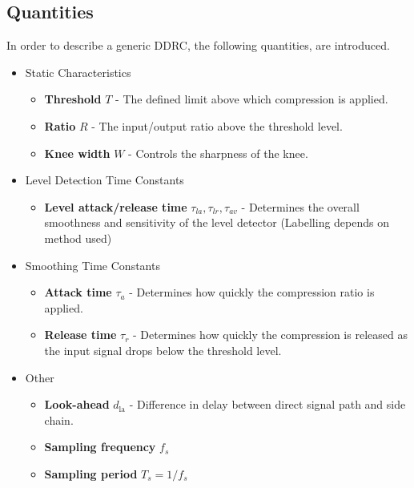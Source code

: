 \documentclass[../main2.tex]{subfiles}
\begin{document}
\subsection{Quantities}\label{theory_definitions}
In order to describe a generic DDRC, the following quantities, are introduced.
\begin{itemize}
\item{Static Characteristics}
	\begin{itemize}
	\item \textbf{Threshold} $T$ - The defined limit above which compression is applied.
	\item \textbf{Ratio} $R$ - The input/output ratio above the threshold level.
	\item \textbf{Knee width}  $W$ - Controls the sharpness of the knee.
\end{itemize}
\item{Level Detection Time Constants}
	\begin{itemize}
	\item \textbf{Level attack/release time} $\tau_{la}, \tau_{lr}, \tau_{av}$ - Determines the overall smoothness and sensitivity of the level detector (Labelling depends on method used)
	\end{itemize}
\item{Smoothing Time Constants}
	\begin{itemize}
	\item \textbf{Attack time} $\tau_{a}$ - Determines how quickly the compression ratio is applied.
	\item \textbf{Release time} $\tau_{r}$ - Determines how quickly the compression is released as the input signal drops below the threshold level.
	\end{itemize}
\item{Other}
	\begin{itemize}
	\item \textbf{Look-ahead} $d_\text{la}$ - Difference in delay between direct signal path and side chain. 
	\item \textbf{Sampling frequency} $f_s$
	\item \textbf{Sampling period} $T_s = 1/f_s$
	\end{itemize}
\end{itemize}
\end{document}
